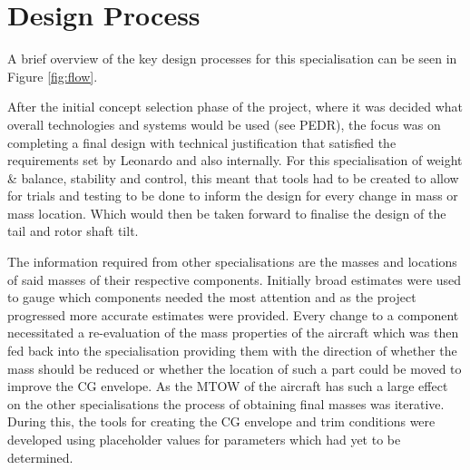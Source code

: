 \documentclass[11pt,a4paper]{article}
\begin{document}
\section{Design Process}
A brief overview of the key design processes for this specialisation can be seen in  Figure \ref{fig:flow}.

After the initial concept selection phase of the project, where it was decided what overall technologies and systems would be used (see PEDR), the focus was on completing a final design with technical justification that satisfied the requirements set by Leonardo and also internally. For this specialisation of weight \& balance, stability and control, this meant that tools had to be created to allow for trials and testing to be done to inform the design for every change in mass or mass location. Which would then be taken forward to finalise the design of the tail and rotor shaft tilt.

The information required from other specialisations are the masses and locations of said masses of their respective components. Initially broad estimates were used to gauge which components needed the most attention and as the project progressed more accurate estimates were provided. Every change to a component necessitated a re-evaluation of the mass properties of the aircraft which was then fed back into the specialisation providing them with the direction of whether the mass should be reduced or whether the location of such a part could be moved to improve the CG envelope. As the MTOW of the aircraft has such a large effect on the other specialisations the process of obtaining final masses was iterative. During this, the tools for creating the  CG envelope and trim conditions were developed using placeholder values for parameters which had yet to be determined.
\end{document}
